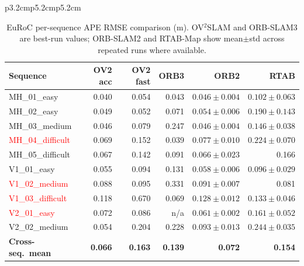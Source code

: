 \documentclass[11pt]{article}
\begin{document}
\begin{table}[ht]
\begin{tabular}{p{3.2cm}p{5.2cm}p{5.2cm}}
\begin{table}[H]
\centering
\scriptsize
\setlength{\tabcolsep}{5pt}
\caption{EuRoC per-sequence APE RMSE comparison (m). OV$^2$SLAM and ORB-SLAM3 are best-run values; ORB-SLAM2 and RTAB-Map show mean$\pm$std across repeated runs where available.}
\label{tab:master_comparison_rmse}
\begin{tabular}{lrrrrr}
\toprule
Sequence & OV2 acc & OV2 fast & ORB3 & ORB2 & RTAB \\
\midrule
MH\_01\_easy & 0.040 & 0.054 & 0.043 & $0.046 \pm 0.004$ & $0.102 \pm 0.063$ \\
MH\_02\_easy & 0.049 & 0.052 & 0.071 & $0.054 \pm 0.006$ & $0.190 \pm 0.143$ \\
MH\_03\_medium & 0.046 & 0.079 & 0.247 & $0.046 \pm 0.004$ & $0.146 \pm 0.038$ \\
\textcolor{red}{MH\_04\_difficult} & 0.069 & 0.152 & 0.039 & $0.077 \pm 0.010$ & $0.224 \pm 0.070$ \\
MH\_05\_difficult & 0.067 & 0.142 & 0.091 & $0.066 \pm 0.023$ & 0.166 \\
V1\_01\_easy & 0.055 & 0.094 & 0.131 & $0.058 \pm 0.006$ & $0.096 \pm 0.029$ \\
\textcolor{red}{V1\_02\_medium} & 0.088 & 0.095 & 0.331 & $0.091 \pm 0.007$ & 0.081 \\
\textcolor{red}{V1\_03\_difficult} & 0.118 & 0.670 & 0.069 & $0.128 \pm 0.012$ & $0.133 \pm 0.046$ \\
\textcolor{red}{V2\_01\_easy} & 0.072 & 0.086 & n/a & $0.061 \pm 0.002$ & $0.161 \pm 0.052$ \\
V2\_02\_medium & 0.054 & 0.204 & 0.228 & $0.093 \pm 0.013$ & $0.244 \pm 0.035$ \\
\midrule
\textbf{Cross-seq.\ mean} & \textbf{0.066} & \textbf{0.163} & \textbf{0.139} & \textbf{0.072} & \textbf{0.154} \\
\bottomrule
\end{tabular}
\end{table}


\end{tabular}
\end{table}
\end{document}
